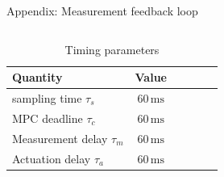 \documentclass[10pt,aspectratio=1610]{beamer} %
\begin{document}
\appendix
\begin{frame}
\end{frame}

\begin{frame}{Appendix: Measurement feedback loop}
	\begin{columns}[onlytextwidth]
		\begin{column}{0.5\textwidth}	
			\begin{table}[h!tbp]
				\small
				\begin{center}
					\begin{tabular}{lccccl}\toprule
						\textbf{Quantity} & \textbf{Value}\\
						\midrule
						sampling time $\tau_{s}$ &$60\,\mathrm{ms}$\\
						MPC deadline $\tau_{c}$ &$60\,\mathrm{ms}$ \\
						Measurement delay $\tau_{m}$ & $60\,\mathrm{ms}$  \\
						Actuation delay $\tau_{a}$ & $60\,\mathrm{ms}$ \\
						\bottomrule
					\end{tabular}
				\end{center}
				\caption{Timing parameters}
			\end{table}
		\end{column}

		\begin{column}{0.5\textwidth}
			\begin{center}
			\def\svgwidth{1.0\textwidth}
			
			\end{center}
		\end{column}
	\end{columns}
\end{frame}
\end{document}
